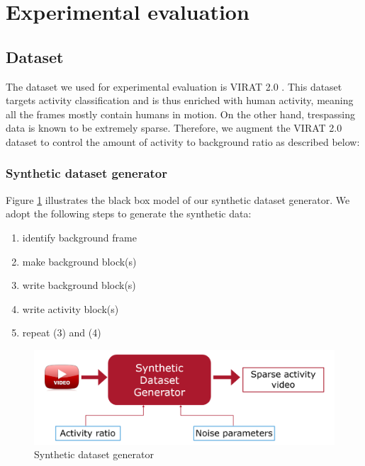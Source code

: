 \section{Experimental evaluation}
\label{sec:exp-eval}
\subsection{Dataset}
The dataset we used for experimental evaluation is VIRAT 2.0 \cite{virat20}. This dataset targets activity classification and is thus enriched with human activity, meaning all the frames mostly contain humans in motion. On the other hand, trespassing data is known to be extremely sparse. Therefore, we augment the VIRAT 2.0 dataset to control the amount of activity to background ratio as described below: 

\vspace{5pt}
\subsubsection{Synthetic dataset generator}
Figure \ref{fig:synthetic-dataset-generator} illustrates the black box model of our synthetic dataset generator. We adopt the following steps to generate the synthetic data: 
\begin{enumerate} 
    \item identify background frame
    \item make background block(s)
    \item write background block(s)
    \item write activity block(s)
    \item repeat (3) and (4)
\end{enumerate}

\begin{figure}
    \centering
    \includegraphics[width=\linewidth]{images/synthetic-dataset-generator.PNG}
    \caption{Synthetic dataset generator}
    \label{fig:synthetic-dataset-generator}
\end{figure}


